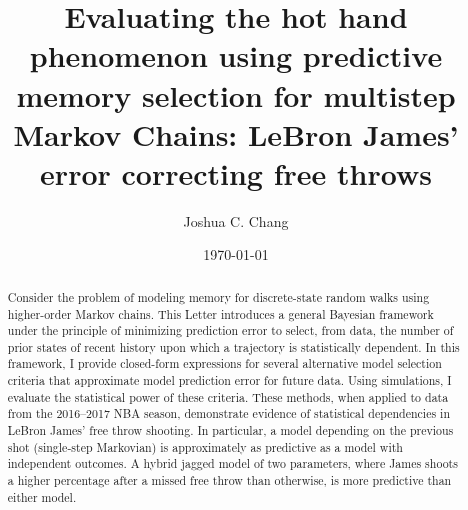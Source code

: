 \documentclass[prl,twocolumn,groupedaddress]{revtex4-1}
\begin{document}
\title[Memory determination in finite-state random walks]{Evaluating the hot hand phenomenon using predictive memory selection for multistep Markov Chains: LeBron James' error correcting free throws}
\author{Joshua C. Chang}
\date{\today}                       

\begin{abstract}
Consider the problem of modeling memory for discrete-state random walks using higher-order Markov chains.  This Letter introduces a general Bayesian framework under the principle of minimizing prediction error to select, from data, the number of prior states of recent history upon which a trajectory is statistically dependent. In this framework, I provide closed-form expressions for several alternative model selection criteria that approximate model prediction error for future data. Using simulations, I evaluate the statistical power of these criteria. These methods, when applied to data from the 2016--2017 NBA season, demonstrate evidence of statistical dependencies in LeBron James' free throw shooting. In particular, a model depending on the previous shot (single-step Markovian) is approximately as predictive as a model with independent outcomes. A hybrid jagged model of two parameters, where James shoots a higher percentage after a missed free throw than otherwise, is more predictive than either model.


\end{abstract}

\maketitle
\end{document}
